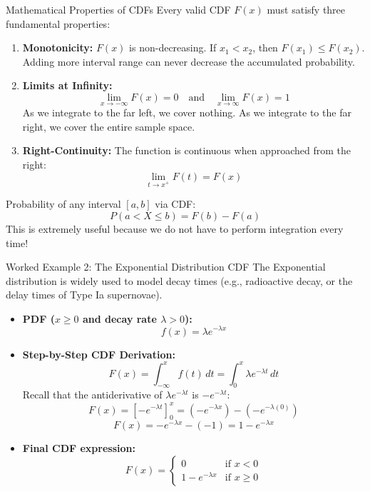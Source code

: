 \documentclass[9pt]{beamer}
\begin{document}
\begin{frame}{Mathematical Properties of CDFs}
  Every valid CDF $F(x)$ must satisfy three fundamental properties:
  \begin{enumerate}
    \item \textbf{Monotonicity:} $F(x)$ is non-decreasing. If $x_1 < x_2$, then $F(x_1) \le F(x_2)$. Adding more interval range can never decrease the accumulated probability.
    \item \textbf{Limits at Infinity:}
      $$\lim_{x \to -\infty} F(x) = 0 \quad \text{and} \quad \lim_{x \to \infty} F(x) = 1$$
      As we integrate to the far left, we cover nothing. As we integrate to the far right, we cover the entire sample space.
    \item \textbf{Right-Continuity:} The function is continuous when approached from the right:
      $$\lim_{t \to x^+} F(t) = F(x)$$
  \end{enumerate}
  \begin{exampleblock}{Probability of any interval $[a, b]$ via CDF:}
    $$P(a < X \le b) = F(b) - F(a)$$
    This is extremely useful because we do not have to perform integration every time!
  \end{exampleblock}
\end{frame}

\begin{frame}{Worked Example 2: The Exponential Distribution CDF}
  The Exponential distribution is widely used to model decay times (e.g., radioactive decay, or the delay times of Type Ia supernovae).
  \begin{itemize}
    \item \textbf{PDF ($x \ge 0$ and decay rate $\lambda > 0$):}
      $$f(x) = \lambda e^{-\lambda x}$$
    \item \textbf{Step-by-Step CDF Derivation:}
      $$F(x) = \int_{-\infty}^{x} f(t) \, dt = \int_{0}^{x} \lambda e^{-\lambda t} \, dt$$
      Recall that the antiderivative of $\lambda e^{-\lambda t}$ is $-e^{-\lambda t}$:
      $$F(x) = \left[ -e^{-\lambda t} \right]_0^x = \left( -e^{-\lambda x} \right) - \left( -e^{-\lambda (0)} \right)$$
      $$F(x) = -e^{-\lambda x} - (-1) = 1 - e^{-\lambda x}$$
    \item \textbf{Final CDF expression:}
      $$F(x) = \begin{cases} 0 & \text{if } x < 0 \\ 1 - e^{-\lambda x} & \text{if } x \ge 0 \end{cases}$$
  \end{itemize}
\end{frame}
\end{document}
